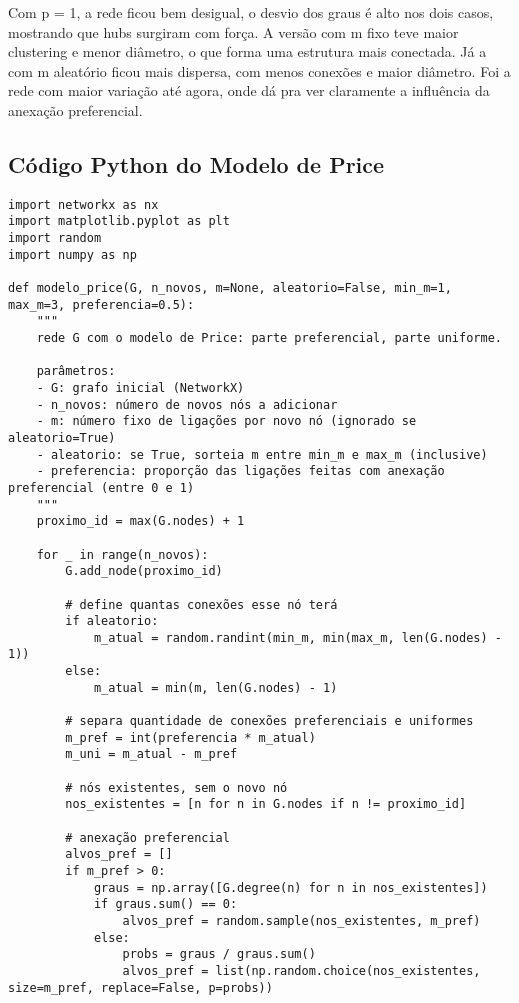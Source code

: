 \documentclass[a4paper]{article}
\begin{document}
Com p = 1, a rede ficou bem desigual, o desvio dos graus é alto nos dois casos, mostrando que hubs surgiram com força. A versão com m fixo teve maior clustering e menor diâmetro, o que forma uma estrutura mais conectada. Já a com m aleatório ficou mais dispersa, com menos conexões e maior diâmetro. Foi a rede com maior variação até agora, onde dá pra ver claramente a influência da anexação preferencial.

\subsection{Código Python do Modelo de Price}

\begin{verbatim}
import networkx as nx
import matplotlib.pyplot as plt
import random
import numpy as np

def modelo_price(G, n_novos, m=None, aleatorio=False, min_m=1, max_m=3, preferencia=0.5):
    """
    rede G com o modelo de Price: parte preferencial, parte uniforme.

    parâmetros:
    - G: grafo inicial (NetworkX)
    - n_novos: número de novos nós a adicionar
    - m: número fixo de ligações por novo nó (ignorado se aleatorio=True)
    - aleatorio: se True, sorteia m entre min_m e max_m (inclusive)
    - preferencia: proporção das ligações feitas com anexação preferencial (entre 0 e 1)
    """
    proximo_id = max(G.nodes) + 1

    for _ in range(n_novos):
        G.add_node(proximo_id)

        # define quantas conexões esse nó terá
        if aleatorio:
            m_atual = random.randint(min_m, min(max_m, len(G.nodes) - 1))
        else:
            m_atual = min(m, len(G.nodes) - 1)

        # separa quantidade de conexões preferenciais e uniformes
        m_pref = int(preferencia * m_atual)
        m_uni = m_atual - m_pref

        # nós existentes, sem o novo nó
        nos_existentes = [n for n in G.nodes if n != proximo_id]

        # anexação preferencial
        alvos_pref = []
        if m_pref > 0:
            graus = np.array([G.degree(n) for n in nos_existentes])
            if graus.sum() == 0:
                alvos_pref = random.sample(nos_existentes, m_pref)
            else:
                probs = graus / graus.sum()
                alvos_pref = list(np.random.choice(nos_existentes, size=m_pref, replace=False, p=probs))


\end{verbatim}
\end{document}
